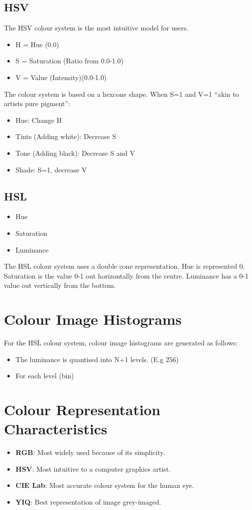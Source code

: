 \documentclass{article}
\begin{document}
\subsection{HSV}
The HSV colour system is the most intuitive model for users.
\begin{itemize}
	\item H = Hue (0.0\degree)
	\item S = Saturation (Ratio from 0.0-1.0)
	\item V = Value (Intensity)(0.0-1.0)
\end{itemize}
The colour system is based on a hexcone shape.
When S=1 and V=1 ``akin to artists pure pigment'':
\begin{itemize}
	\item Hue: Change H
	\item Tints (Adding white): Decrease S
	\item Tone (Adding black): Decrease S and V
	\item Shade: S=1, decrease V
\end{itemize}

\subsection{HSL}
\begin{itemize}
	\item Hue
	\item Saturation
	\item Luminance
\end{itemize}
The HSL colour system uses a double cone representation.
Hue is represented 0\degree.
Saturation is the value 0-1 out horizontally from the centre.
Luminance has a 0-1 value out vertically from the bottom.

\section{Colour Image Histograms}
For the HSL colour system, colour image histograms are generated as follows:
\begin{itemize}
	\item The luminance is quantised into N+1 levels. (E.g 256)
	\item For each level (bin)
\end{itemize}

\section{Colour Representation Characteristics}
\begin{itemize}
	\item \textbf{RGB}: Most widely used because of its simplicity. 
	\item \textbf{HSV}: Most intuitive to a computer graphics artist. 
	\item \textbf{CIE Lab}: Most accurate colour system for the human eye. 
	\item \textbf{YIQ}: Best representation of image grey-imaged. 
\end{itemize}
\end{document}
